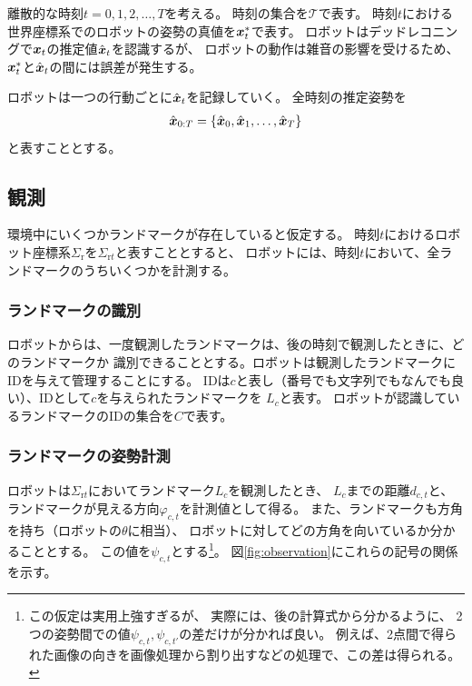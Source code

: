 
離散的な時刻$t = 0,1,2,\dots,T$を考える。
時刻の集合を$\mathcal{T}$で表す。
時刻$t$における世界座標系でのロボットの姿勢の真値を$\boldsymbol{x}_t^*$で表す。
ロボットはデッドレコニングで$\boldsymbol{x}_t$の推定値$\hat{\boldsymbol{x}}_t$を認識するが、
ロボットの動作は雑音の影響を受けるため、
$\boldsymbol{x}_t^*$と$\hat{\boldsymbol{x}}_t$の間には誤差が発生する。


ロボットは一つの行動ごとに$\hat{\boldsymbol{x}}_t$を記録していく。
全時刻の推定姿勢を
\begin{align}
\hat{\boldsymbol{x}}_{0:T} = \{\hat{\boldsymbol{x}}_0, \hat{\boldsymbol{x}}_1, \dots, \hat{\boldsymbol{x}}_T \}
\end{align}
と表すこととする。

\subsection{観測}

環境中にいくつかランドマークが存在していると仮定する。
時刻$t$におけるロボット座標系$\Sigma_\text{r}$を$\Sigma_{\text{r}t}$と表すこととすると、
ロボットには、時刻$t$において、全ランドマークのうちいくつかを計測する。

\subsubsection{ランドマークの識別}

ロボットからは、一度観測したランドマークは、後の時刻で観測したときに、どのランドマークか
識別できることとする。ロボットは観測したランドマークにIDを与えて管理することにする。
IDは$c$と表し（番号でも文字列でもなんでも良い）、IDとして$c$を与えられたランドマークを
$L_c$と表す。
ロボットが認識しているランドマークのIDの集合を$C$で表す。

\subsubsection{ランドマークの姿勢計測}

ロボットは$\Sigma_{\text{r}t}$においてランドマーク$L_c$を観測したとき、
$L_c$までの距離$d_{c,t}$と、ランドマークが見える方向$\varphi_{c,t}$を計測値として得る。
また、ランドマークも方角を持ち（ロボットの$\theta$に相当）、
ロボットに対してどの方角を向いているか分かることとする。
この値を$\psi_{c,t}$とする\footnote{この仮定は実用上強すぎるが、
実際には、後の計算式から分かるように、
2つの姿勢間での値$\psi_{c,t}, \psi_{c,t'}$の差だけが分かれば良い。
例えば、2点間で得られた画像の向きを画像処理から割り出すなどの処理で、この差は得られる。}。
図\ref{fig:observation}にこれらの記号の関係を示す。

